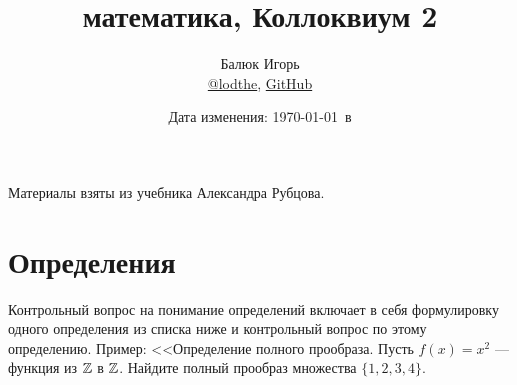 \documentclass[a4paper]{article}
\title{\HugeДискретная математика, Коллоквиум 2}
\author{
	Балюк Игорь \\
	\href{https://teleg.run/lodthe}{@lodthe},
    \href{https://github.com/LoDThe/hse-tex}{GitHub} \\
}
\date{Дата изменения: \today \ в \currenttime}
\theoremstyle{named}
\begin{document}
    \maketitle

    Материалы взяты из учебника Александра Рубцова.

    \tableofcontents

    \newpage

    \section{Определения}

    Контрольный вопрос на понимание определений включает в себя формулировку одного определения из списка ниже и контрольный вопрос по этому определению. Пример: <<Определение полного прообраза. Пусть $f(x) = x^2$ --- функция из $\mathbb{Z}$ в $\mathbb{Z}$. Найдите полный прообраз множества $\{1, 2, 3, 4\}$.
\end{document}
